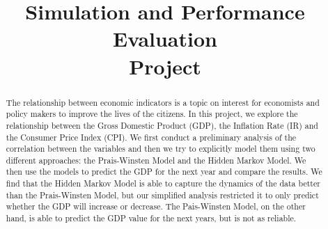 \documentclass[conference]{IEEEtran}
\begin{document}
\title{Simulation and Performance Evaluation\\ Project}


\author{
  \and
}

\maketitle

\begin{abstract}
  The relationship between economic indicators is a topic on interest for economists and policy makers to improve the lives of the citizens. In this project, we explore the relationship between the Gross Domestic Product (GDP), the Inflation Rate (IR) and the Consumer Price Index (CPI). We first conduct a preliminary analysis of the correlation between the variables and then we try to explicitly model them using two different approaches: the Prais-Winsten Model and the Hidden Markov Model. We then use the models to predict the GDP for the next year and compare the results. We find that the Hidden Markov Model is able to capture the dynamics of the data better than the Prais-Winsten Model, but our simplified analysis restricted it to only predict whether the GDP will increase or decrease. The Pais-Winsten Model, on the other hand, is able to predict the GDP value for the next years, but is not as reliable.
\end{abstract}


\IEEEpeerreviewmaketitle








\newpage







\newpage


\end{document}
